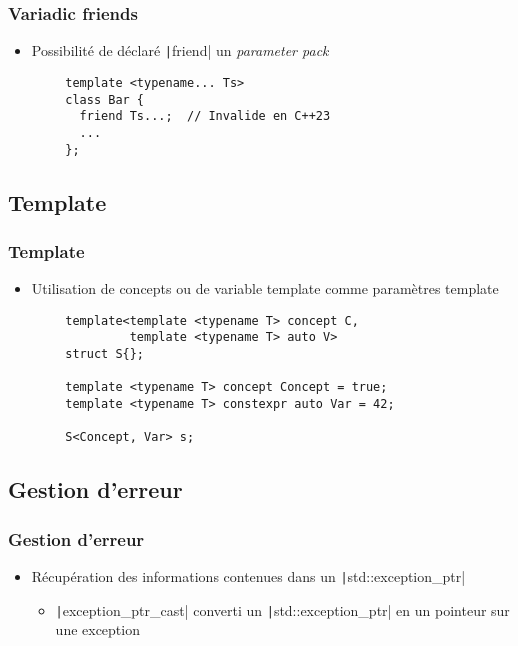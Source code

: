 \documentclass[C++.tex]{subfiles}
\begin{document}
\begin{frame}[fragile]
	\frametitle{Variadic friends}
	\begin{itemize}
		\item Possibilité de déclaré \texttt|friend| un \textit{parameter pack}
	\end{itemize}

	\begin{verbatim}
		template <typename... Ts>
		class Bar {
		  friend Ts...;  // Invalide en C++23
		  ...
		};
	\end{verbatim}

\end{frame}

\subsection*{Template}
\begin{frame}[fragile]
	\frametitle{Template}
	\begin{itemize}
		\item Utilisation de concepts ou de variable template comme paramètres template
	\end{itemize}

	\begin{verbatim}
		template<template <typename T> concept C,
		         template <typename T> auto V>
		struct S{};

		template <typename T> concept Concept = true;
		template <typename T> constexpr auto Var = 42;

		S<Concept, Var> s;
	\end{verbatim}

\end{frame}

\subsection*{Gestion d'erreur}
\begin{frame}[fragile]
	\frametitle{Gestion d'erreur}
	\begin{itemize}
		\item Récupération des informations contenues dans un \texttt|std::exception_ptr|
		\begin{itemize}
			\item \texttt|exception_ptr_cast| converti un \texttt|std::exception_ptr| en un pointeur sur une exception
		\end{itemize}
	\end{itemize}

\end{frame}
\end{document}
